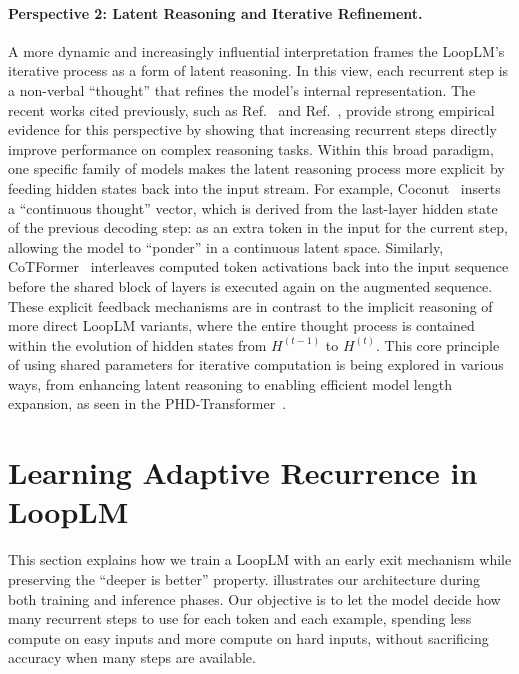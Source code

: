 \documentclass[]{bytedance_seed}
\newcommand{\1}{\mathbf{1}}
\newcommand{\ut}{LoopLM}
\begin{document}
\paragraph{Perspective 2: Latent Reasoning and Iterative Refinement.}
A more dynamic and increasingly influential interpretation frames the \ut{}'s iterative process as a form of latent reasoning. In this view, each recurrent step is a non-verbal ``thought'' that refines the model's internal representation. The recent works cited previously, such as Ref.~\cite{geiping2025scaling} and Ref.~\cite{saunshi2025reasoning}, provide strong empirical evidence for this perspective by showing that increasing recurrent steps directly improve performance on complex reasoning tasks. Within this broad paradigm, one specific family of models makes the latent reasoning process more explicit by feeding hidden states back into the input stream. For example, Coconut~\cite{hao2024training} inserts a ``continuous thought'' vector, which is derived from the last-layer hidden state of the previous decoding step: as an extra token in the input for the current step, allowing the model to ``ponder'' in a continuous latent space. Similarly, CoTFormer~\cite{mohtashami2023cotformer} interleaves computed token activations back into the input sequence before the shared block of layers is executed again on the augmented sequence. These explicit feedback mechanisms are in contrast to the implicit reasoning of more direct \ut{} variants, where the entire thought process is contained within the evolution of hidden states from $H^{(t-1)}$ to $H^{(t)}$. This core principle of using shared parameters for iterative computation is being explored in various ways, from enhancing latent reasoning to enabling efficient model length expansion, as seen in the PHD-Transformer~\cite{wu2025efficient}.

\section{Learning Adaptive Recurrence in \ut{}}

This section explains how we train a \ut{} with an early exit mechanism while preserving 
the ``deeper is better'' property.  illustrates our architecture 
during both training and inference phases. Our objective is to let the model decide how many 
recurrent steps to use for each token and each example, spending less compute on easy 
inputs and more compute on hard inputs, without sacrificing accuracy when many steps are available.
\end{document}
